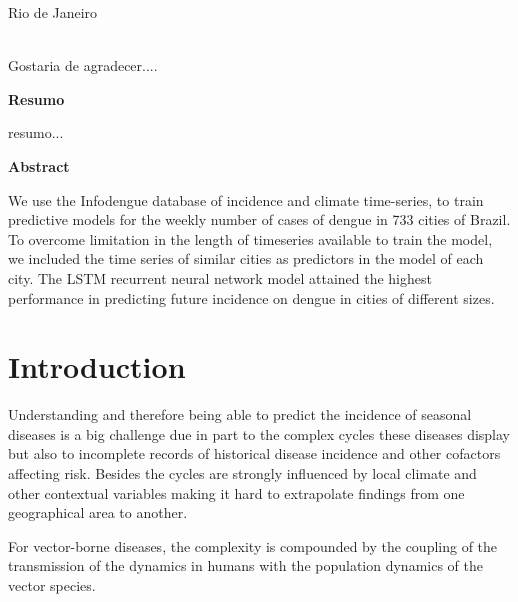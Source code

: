 \documentclass[12pt]{report}
\begin{document}
\par
\vfill
\begin{center}
{{\normalsize Rio de Janeiro}\\
{\normalsize \the\year}}
\end{center}

\thispagestyle{empty}

\newpage
{}\\
\doublespacing
Gostaria de agradecer....

\thispagestyle{empty}

\newpage
\begin{center}
\textbf{\normalsize Resumo}
\end{center}
\vspace{1pt}

resumo...

\thispagestyle{empty}

\newpage
\begin{center}
\textbf{\normalsize Abstract}
\end{center}
\vspace{1pt}

We use the Infodengue database of incidence and climate time-series, to train predictive models for the weekly number of cases of dengue in 733 cities of Brazil. To overcome limitation in the length of timeseries available to train the model, we included the time series of similar cities as predictors in the model of each city. The LSTM recurrent neural network model attained the highest performance in predicting future incidence on dengue in cities of different sizes. 

\thispagestyle{empty}

\newpage
\tableofcontents
\listoffigures
\thispagestyle{empty}

\newpage
\chapter{Introduction}

Understanding and therefore being able to predict the incidence of seasonal diseases is a big challenge due in part to the complex cycles these diseases display but also to  incomplete records of historical disease incidence and other cofactors affecting risk. Besides the cycles are strongly influenced by local climate  and other contextual variables making it hard to extrapolate findings from one geographical area to another.

For vector-borne diseases, the complexity is compounded by the coupling of the transmission of the dynamics in humans with the population dynamics of the vector species.
\end{document}
